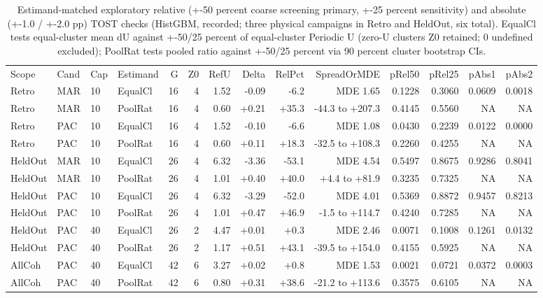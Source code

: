 \begin{table}[!ht]
\centering\footnotesize\setlength{\tabcolsep}{2.2pt}
\caption{Estimand-matched exploratory relative (+-50 percent coarse screening primary, +-25 percent sensitivity) and absolute (+-1.0 / +-2.0 pp) TOST checks (HistGBM, recorded; three physical campaigns in Retro and HeldOut, six total). EqualCl tests equal-cluster mean dU against +-50/25 percent of equal-cluster Periodic U (zero-U clusters Z0 retained; 0 undefined excluded); PoolRat tests pooled ratio against +-50/25 percent via 90 percent cluster bootstrap CIs.}
\begin{tabular}{llllrrrrrrrrrr}
\hline
Scope & Cand & Cap & Estimand & G & Z0 & RefU & Delta & RelPct & SpreadOrMDE & pRel50 & pRel25 & pAbs1 & pAbs2 \\
Retro & MAR & 10 & EqualCl & 16 & 4 & 1.52 & -0.09 & -6.2 & MDE 1.65 & 0.1228 & 0.3060 & 0.0609 & 0.0018 \\
Retro & MAR & 10 & PoolRat & 16 & 4 & 0.60 & +0.21 & +35.3 & -44.3 to +207.3 & 0.4145 & 0.5560 & NA & NA \\
Retro & PAC & 10 & EqualCl & 16 & 4 & 1.52 & -0.10 & -6.6 & MDE 1.08 & 0.0430 & 0.2239 & 0.0122 & 0.0000 \\
Retro & PAC & 10 & PoolRat & 16 & 4 & 0.60 & +0.11 & +18.3 & -32.5 to +108.3 & 0.2260 & 0.4255 & NA & NA \\
HeldOut & MAR & 10 & EqualCl & 26 & 4 & 6.32 & -3.36 & -53.1 & MDE 4.54 & 0.5497 & 0.8675 & 0.9286 & 0.8041 \\
HeldOut & MAR & 10 & PoolRat & 26 & 4 & 1.01 & +0.40 & +40.0 & +4.4 to +81.9 & 0.3235 & 0.7325 & NA & NA \\
HeldOut & PAC & 10 & EqualCl & 26 & 4 & 6.32 & -3.29 & -52.0 & MDE 4.01 & 0.5369 & 0.8872 & 0.9457 & 0.8213 \\
HeldOut & PAC & 10 & PoolRat & 26 & 4 & 1.01 & +0.47 & +46.9 & -1.5 to +114.7 & 0.4240 & 0.7285 & NA & NA \\
HeldOut & PAC & 40 & EqualCl & 26 & 2 & 4.47 & +0.01 & +0.3 & MDE 2.46 & 0.0071 & 0.1008 & 0.1261 & 0.0132 \\
HeldOut & PAC & 40 & PoolRat & 26 & 2 & 1.17 & +0.51 & +43.1 & -39.5 to +154.0 & 0.4155 & 0.5925 & NA & NA \\
AllCoh & PAC & 40 & EqualCl & 42 & 6 & 3.27 & +0.02 & +0.8 & MDE 1.53 & 0.0021 & 0.0721 & 0.0372 & 0.0003 \\
AllCoh & PAC & 40 & PoolRat & 42 & 6 & 0.80 & +0.31 & +38.6 & -21.2 to +113.6 & 0.3575 & 0.6105 & NA & NA \\
\hline
\end{tabular}
\end{table}
